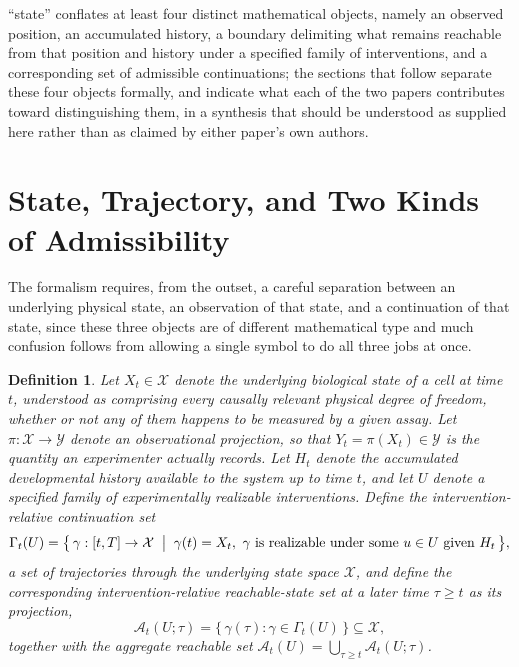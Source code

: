 \documentclass[11pt]{article}
\newtheorem{definition}{Definition}
\begin{document}
``state'' conflates at least four distinct mathematical objects, namely an observed position, an accumulated history, a boundary delimiting what remains reachable from that position and history under a specified family of interventions, and a corresponding set of admissible continuations; the sections that follow separate these four objects formally, and indicate what each of the two papers contributes toward distinguishing them, in a synthesis that should be understood as supplied here rather than as claimed by either paper's own authors.

\section{State, Trajectory, and Two Kinds of Admissibility}

The formalism requires, from the outset, a careful separation between an underlying physical state, an observation of that state, and a continuation of that state, since these three objects are of different mathematical type and much confusion follows from allowing a single symbol to do all three jobs at once.

\begin{definition}
Let $X_t \in \mathcal{X}$ denote the underlying biological state of a cell at time $t$, understood as comprising every causally relevant physical degree of freedom, whether or not any of them happens to be measured by a given assay. Let $\pi : \mathcal{X} \to \mathcal{Y}$ denote an observational projection, so that $Y_t = \pi(X_t) \in \mathcal{Y}$ is the quantity an experimenter actually records. Let $H_t$ denote the accumulated developmental history available to the system up to time $t$, and let $U$ denote a specified family of experimentally realizable interventions. Define the intervention-relative continuation set
\begin{equation}
\Gamma_t(U) = \bigl\{\, \gamma : [t,T] \to \mathcal{X} \;\bigm|\; \gamma(t) = X_t,\ \gamma \text{ is realizable under some } u \in U \text{ given } H_t \,\bigr\},
\end{equation}
a set of trajectories through the underlying state space $\mathcal{X}$, and define the corresponding intervention-relative reachable-state set at a later time $\tau \geq t$ as its projection,
\begin{equation}
\mathcal{A}_t(U;\tau) = \bigl\{\, \gamma(\tau) : \gamma \in \Gamma_t(U) \,\bigr\} \subseteq \mathcal{X},
\end{equation}
together with the aggregate reachable set $\mathcal{A}_t(U) = \bigcup_{\tau \geq t} \mathcal{A}_t(U;\tau)$.
\end{definition}
\end{document}
